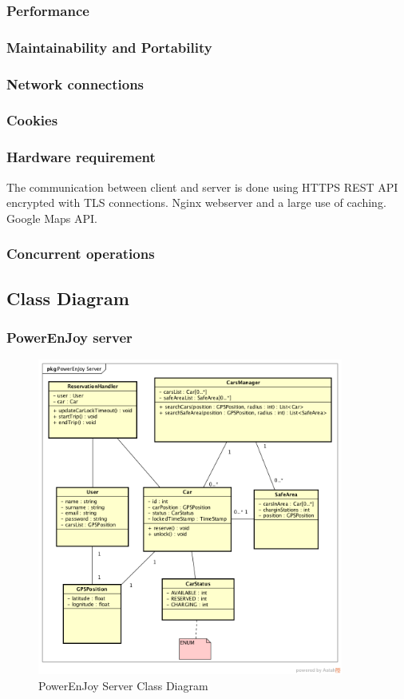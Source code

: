 \subsubsection{Performance}


\subsubsection{Maintainability and Portability}




\subsubsection{Network connections}


\subsubsection{Cookies}



\subsubsection{Hardware requirement}
The communication between client and server is done using HTTPS REST API encrypted with TLS connections.
Nginx webserver and a large use of caching.
Google Maps API.



\subsubsection{Concurrent operations}

\pagebreak


\pagebreak
\subsection{Class Diagram}
\subsubsection{PowerEnJoy server}
\begin{figure}[h]
	\centering
	\includegraphics[width=380px]{img/classdiagram_server}
	\caption{PowerEnJoy Server Class Diagram}
\end{figure}
\FloatBarrier
